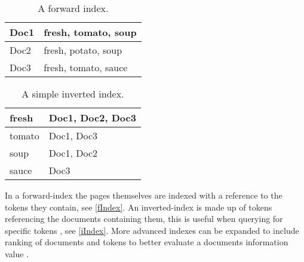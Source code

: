 \begin{minipage}{.40\textwidth}
  \centering
  \begin{table}[H]
	\centering
    \begin{tabular}{|l|l|}
\hline
Doc1 & fresh, tomato, soup \\ \hline
Doc2 & fresh, potato, soup \\ \hline
Doc3 & fresh, tomato, sauce \\ \hline
	\end{tabular}
	\caption{A forward index.}
	\label{fIndex}
  \end{table}
\end{minipage}
\begin{minipage}{0.5\textwidth}
  \centering
  \begin{table}[H]
	\centering
    \begin{tabular}{|l|l|}
\hline
fresh & Doc1, Doc2, Doc3 \\ \hline
tomato & Doc1, Doc3 \\ \hline
soup & Doc1, Doc2 \\ \hline
sauce & Doc3 \\ \hline
	\end{tabular}
	\caption{A simple inverted index.}
	\label{iIndex}
  \end{table}
\end{minipage}\nl

In a forward-index the pages themselves are indexed with a reference to the
tokens they contain, see \autoref{fIndex}. An inverted-index is made up of
tokens referencing the documents containing them, this is useful when
querying for specific tokens \citep{Index3}, see \autoref{iIndex}. More advanced
indexes can be expanded to include ranking of documents and tokens to better
evaluate a documents information value \citep[P. 109]{manning2008introduction}.

